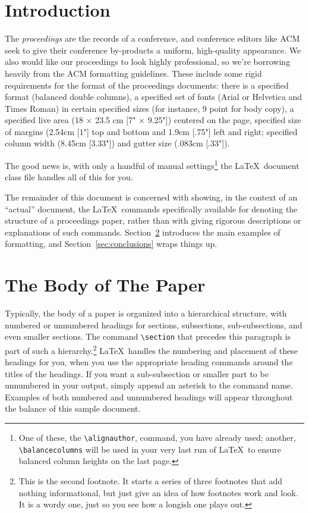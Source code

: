 \documentclass{sig-alternate}
\begin{document}

\section{Introduction}
\label{sec:introduction}

The \textit{proceedings} are the records of a conference, and conference
editors like ACM seek to give their conference by-products a uniform,
high-quality appearance. We also would like our proceedings to look highly
professional, so we're borrowing heavily from the ACM formatting guidelines.
These include some
rigid requirements for the format of the proceedings documents: there
is a specified format (balanced  double columns), a specified
set of fonts (Arial or Helvetica and Times Roman) in
certain specified sizes (for instance, 9 point for body copy),
a specified live area (18 $\times$ 23.5 cm [7" $\times$ 9.25"]) centered on
the page, specified size of margins (2.54cm [1"] top and
bottom and 1.9cm [.75"] left and right; specified column width
(8.45cm [3.33"]) and gutter size (.083cm [.33"]).


The good news is, with only a handful of manual
settings\footnote{One of these, the \texttt{\textbackslash alignauthor}, command, 
you have
already used; another, \texttt{\textbackslash balancecolumns} will
be used in your very last run of \LaTeX\ to ensure
balanced column heights on the last page.} the \LaTeX\ document
class file handles all of this for you.

The remainder of this document is concerned with showing, in
the context of an ``actual'' document, the \LaTeX\ commands
specifically available for denoting the structure of a
proceedings paper, rather than with giving rigorous descriptions
or explanations of such commands. Section~\ref{sec:body} introduces the main
examples of formatting, and Section~\ref{sec:conclusions} wraps things up. 

\section{The {\secit Body} of The Paper}
\label{sec:body}

Typically, the body of a paper is organized
into a hierarchical structure, with numbered or unnumbered
headings for sections, subsections, sub-subsections, and even
smaller sections.  The command \texttt{\textbackslash section} that
precedes this paragraph is part of such a
hierarchy.\footnote{This is the second footnote.  It
starts a series of three footnotes that add nothing
informational, but just give an idea of how footnotes work
and look. It is a wordy one, just so you see
how a longish one plays out.} \LaTeX\ handles the numbering
and placement of these headings for you, when you use
the appropriate heading commands around the titles
of the headings.  If you want a sub-subsection or
smaller part to be unnumbered in your output, simply append an
asterisk to the command name.  Examples of both
numbered and unnumbered headings will appear throughout the
balance of this sample document.
\end{document}
